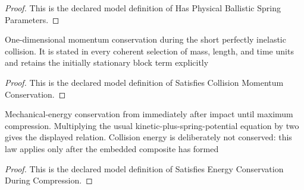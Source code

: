 \begin{proof}
  This is the declared model definition of Has Physical Ballistic Spring Parameters.
\end{proof}
\begin{definition}
  \label{def:physics:phyx-mini-0202:phyxminiproblems-problemphyxmini0202-satisfiescollisionmomentumconservation}
  One-dimensional momentum conservation during the short perfectly inelastic collision. It is stated in every coherent selection of mass, length, and time units and retains the initially stationary block term explicitly
\end{definition}
\begin{proof}
  This is the declared model definition of Satisfies Collision Momentum Conservation.
\end{proof}
\begin{definition}
  \label{def:physics:phyx-mini-0202:phyxminiproblems-problemphyxmini0202-satisfiesenergyconservationduringcompression}
  Mechanical-energy conservation from immediately after impact until maximum compression. Multiplying the usual kinetic-plus-spring-potential equation by two gives the displayed relation. Collision energy is deliberately not conserved: this law applies only after the embedded composite has formed
\end{definition}
\begin{proof}
  This is the declared model definition of Satisfies Energy Conservation During Compression.
\end{proof}
